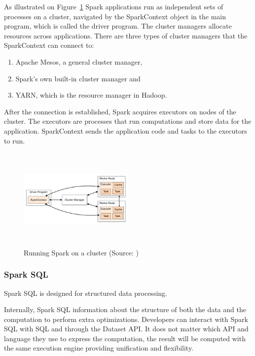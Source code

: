 As illustrated on Figure~\ref{fig:spark-cluster} Spark applications run as independent sets of processes on a cluster, navigated by the SparkContext object in the main program, which is called the driver program. The cluster managers allocate resources across applications. There are three types of cluster managers that the SparkContext can connect to:
\begin{enumerate}
\item Apache Mesos, a general cluster manager, 
\item Spark's own built-in cluster manager and
\item YARN, which is the resource manager in Hadoop.
\end{enumerate}
After the connection is established, Spark acquires executors on nodes of the cluster. The executors are processes that run computations and store data for the application. SparkContext sends the application code and tasks to the executors to run.
\cite{spark-cluster}

\begin{figure}[h]
    \centering
    \includegraphics[width=0.5\textwidth, height=5cm]{images/cluster-overview}
    \caption{Running Spark on a cluster (Source: \cite{spark-cluster})}
    \label{fig:spark-cluster}
\end{figure}

\subsubsection{Spark SQL}
Spark SQL is designed for structured data processing.

Internally, Spark SQL information about the structure of both the data and the computation to perform extra optimizations. Developers can interact with Spark SQL with SQL and through the Dataset API. It does not matter which API and language they use to express the computation, the result will be computed with the same execution engine providing unification and flexibility. \cite{spark-sql}

